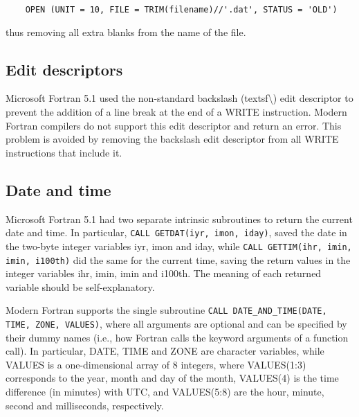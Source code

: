 \begin{lstlisting}
	OPEN (UNIT = 10, FILE = TRIM(filename)//'.dat', STATUS = 'OLD')
\end{lstlisting}

thus removing all extra blanks from the name of the file.



\subsection{Edit descriptors}

Microsoft Fortran 5.1 used the non-standard backslash (textsf{\textbackslash{}}) edit descriptor to prevent the addition of a line break at the end of a \textsf{WRITE} instruction.
Modern Fortran compilers do not support this edit descriptor and return an error. This problem is avoided by removing the backslash edit descriptor from all \textsf{WRITE} instructions that include it.



\subsection{Date and time}

Microsoft Fortran 5.1 had two separate intrinsic subroutines to return the current date and time.
In particular, \lstinline[columns=fixed]{CALL GETDAT(iyr, imon, iday)}, saved the date in the two-byte integer variables \textsf{iyr}, \textsf{imon} and \textsf{iday}, while \lstinline[columns=fixed]{CALL GETTIM(ihr, imin, imin, i100th)} did the same for the current time, saving the return values in the integer variables \textsf{ihr}, \textsf{imin}, \textsf{imin} and \textsf{i100th}. The meaning of each returned variable should be self-explanatory.

Modern Fortran supports the single subroutine \lstinline[columns=fixed]{CALL DATE_AND_TIME(DATE, TIME, ZONE, VALUES)}, where all arguments are optional and can be specified by their dummy names (i.e., how Fortran calls the keyword arguments of a function call). 
In particular, \textsf{DATE}, \textsf{TIME} and \textsf{ZONE} are character variables, while \textsf{VALUES} is a one-dimensional array of 8 integers, where \textsf{VALUES(1:3)} corresponds to the year, month and day of the month, \textsf{VALUES(4)} is the time difference (in minutes) with UTC, and \textsf{VALUES(5:8)} are the hour, minute, second and milliseconds, respectively.

